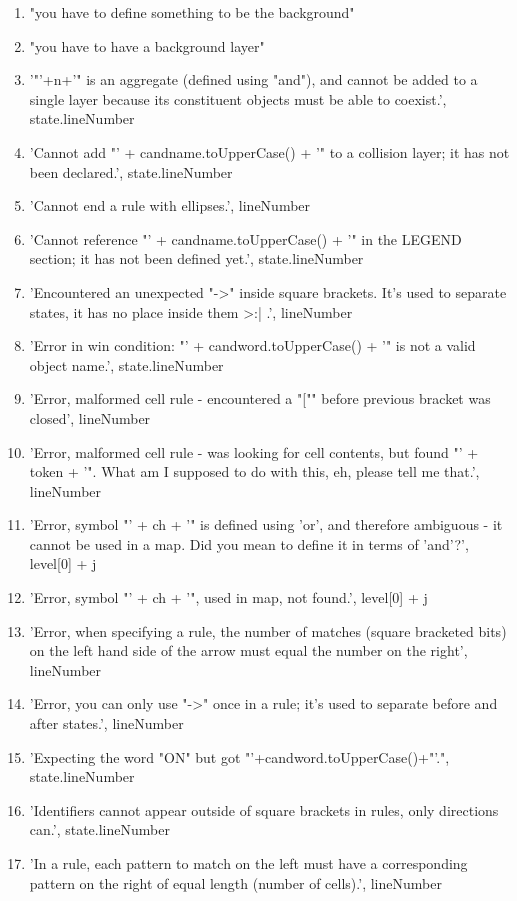 \begin{enumerate}
    \item "you have to define something to be the background"
    \item "you have to have a background layer"
    \item '"'+n+'" is an aggregate (defined using "and"), and cannot be added to a single layer because its constituent objects must be able to coexist.', state.lineNumber
    \item 'Cannot add "' + candname.toUpperCase() + '" to a collision layer; it has not been declared.', state.lineNumber
    \item 'Cannot end a rule with ellipses.', lineNumber
    \item 'Cannot reference "' + candname.toUpperCase() + '" in the LEGEND section; it has not been defined yet.', state.lineNumber
    \item 'Encountered an unexpected "->" inside square brackets.  It's used to separate states, it has no place inside them >:| .', lineNumber
    \item 'Error in win condition: "' + candword.toUpperCase() + '" is not a valid object name.', state.lineNumber
    \item 'Error, malformed cell rule - encountered a "["" before previous bracket was closed', lineNumber
    \item 'Error, malformed cell rule - was looking for cell contents, but found "' + token + '".  What am I supposed to do with this, eh, please tell me that.', lineNumber
    \item 'Error, symbol "' + ch + '" is defined using 'or', and therefore ambiguous - it cannot be used in a map. Did you mean to define it in terms of 'and'?', level[0] + j
    \item 'Error, symbol "' + ch + '", used in map, not found.', level[0] + j
    \item 'Error, when specifying a rule, the number of matches (square bracketed bits) on the left hand side of the arrow must equal the number on the right', lineNumber
    \item 'Error, you can only use "->" once in a rule; it's used to separate before and after states.', lineNumber
    \item 'Expecting the word "ON" but got "'+candword.toUpperCase()+"'.", state.lineNumber
    \item 'Identifiers cannot appear outside of square brackets in rules, only directions can.', state.lineNumber
    \item 'In a rule, each pattern to match on the left must have a corresponding pattern on the right of equal length (number of cells).', lineNumber

\end{enumerate}
